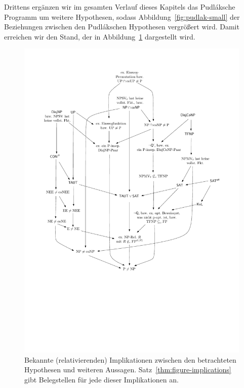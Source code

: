 
Drittens ergänzen wir im gesamten Verlauf dieses Kapitels das Pudláksche Programm um weitere Hypothesen, sodass Abbildung~\ref{fig:pudlak-small} der Beziehungen zwischen den Pudlákschen Hypothesen vergrößert wird. Damit erreichen wir den Stand, der in Abbildung~\ref{fig:figure-implications} dargestellt wird.


\begin{figure}
    \includegraphics[page=1]{figures.pdf}
    \caption{Bekannte (relativierenden) Implikationen zwischen den betrachteten Hypothesen und weiteren Aussagen. Satz~\ref{thm:figure-implications} gibt Belegstellen für jede dieser Implikationen an.}\label{fig:figure-implications}
    \forceversofloat
\end{figure}

